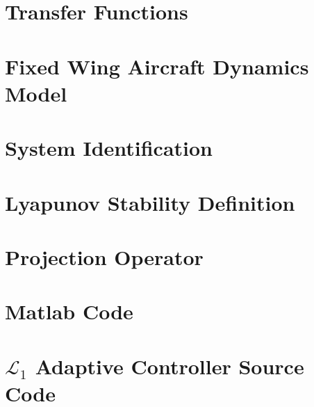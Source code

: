 \documentclass[twoside,thesis,twoadvisorsreader]{npsreport}
\newcommand{\Lone}{$\mathcal{L}_1$ }
\begin{document}
\NPSappendices

\chapter{Transfer Functions}


\chapter{Fixed Wing Aircraft Dynamics Model}


\chapter{System Identification}


\chapter{Lyapunov Stability Definition}


\chapter{Projection Operator}


\chapter{Matlab Code}


\chapter{\Lone Adaptive Controller Source Code}


%

%


%
%
\NPSend
\end{document}

